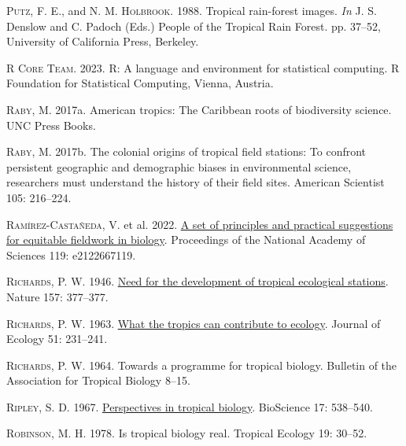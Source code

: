 \documentclass[
  12pt,
  man, donotrepeattitle,floatsintext]{apa6}
\newlength{\cslhangindent}
\newlength{\cslentryspacingunit} %
\newenvironment{CSLReferences}[2] %
 {%
  \setlength{\parindent}{0pt}
  \ifodd #1
  \let\oldpar\par
  \def\par{\hangindent=\cslhangindent\oldpar}
  \fi
  \setlength{\parskip}{#2\cslentryspacingunit}
 }%
 {}
\begin{document}
\begin{CSLReferences}{1}{0}
\leavevmode{}%
\textsc{Putz, F. E.}, and \textsc{N. M. Holbrook}. 1988. Tropical rain-forest images. \emph{In} J. S. Denslow and C. Padoch (Eds.) People of the {Tropical Rain Forest}. pp. 37--52, University of California Press, Berkeley.

\leavevmode{}%
\textsc{R Core Team}. 2023. R: {A} language and environment for statistical computing. R Foundation for Statistical Computing, Vienna, Austria.

\leavevmode{}%
\textsc{Raby, M.} 2017a. American tropics: The {Caribbean} roots of biodiversity science. UNC Press Books.

\leavevmode{}%
\textsc{Raby, M.} 2017b. The colonial origins of tropical field stations: To confront persistent geographic and demographic biases in environmental science, researchers must understand the history of their field sites. American Scientist 105: 216--224.

\leavevmode{}%
\textsc{Ramírez-Castañeda, V.} et al. 2022. \href{https://doi.org/10.1073/pnas.2122667119}{A set of principles and practical suggestions for equitable fieldwork in biology}. Proceedings of the National Academy of Sciences 119: e2122667119.

\leavevmode{}%
\textsc{Richards, P. W.} 1946. \href{https://doi.org/10.1038/157377a0}{Need for the development of tropical ecological stations}. Nature 157: 377--377.

\leavevmode{}%
\textsc{Richards, P. W.} 1963. \href{https://doi.org/10.2307/2257682}{What the tropics can contribute to ecology}. Journal of Ecology 51: 231--241.

\leavevmode{}%
\textsc{Richards, P. W.} 1964. Towards a programme for tropical biology. Bulletin of the Association for Tropical Biology 8--15.

\leavevmode{}%
\textsc{Ripley, S. D.} 1967. \href{https://doi.org/10.2307/1294011}{Perspectives in tropical biology}. BioScience 17: 538--540.

\leavevmode{}%
\textsc{Robinson, M. H.} 1978. Is tropical biology real. Tropical Ecology 19: 30--52.


\end{CSLReferences}
\end{document}
